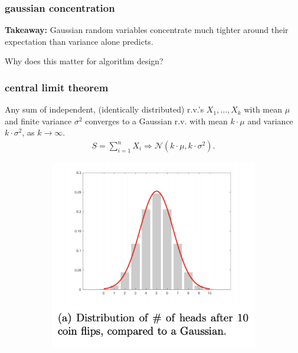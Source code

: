 \documentclass[handout,compress]{beamer}
\begin{document}
\begin{frame}
\end{frame}

\begin{frame}
	\frametitle{gaussian concentration}
	\textbf{Takeaway:} Gaussian random variables concentrate much tighter around their expectation than variance alone  predicts.
	
		\begin{center}
			\alert{Why does this matter for algorithm design?}
		\end{center}
\end{frame}

\begin{frame}
	\frametitle{central limit theorem}
	\begin{theorem}
		Any sum of \alert{independent}, \alert{(identically distributed)}  r.v.'s $X_1,  \ldots, X_k$ with mean $\mu$ and finite variance $\sigma^2$ converges to a Gaussian r.v. with mean $k\cdot\mu$ and variance $k\cdot\sigma^2$, as $k\rightarrow \infty$.
		\vspace{-.5em}
		\begin{align*}
			S = \sum_{i=1}^n X_i \Longrightarrow \mathcal{N}(k\cdot\mu, k\cdot\sigma^2).
		\end{align*}	
		\vspace{-.5em}	
	\end{theorem}
	\vspace{-.5em}	
		\begin{figure}
			\begin{subfigure}[t]{0.4\textwidth}
				\centering
				\includegraphics[width=\textwidth]{cltWide.png}

\end{subfigure}
\end{figure}
\end{frame}
\end{document}
